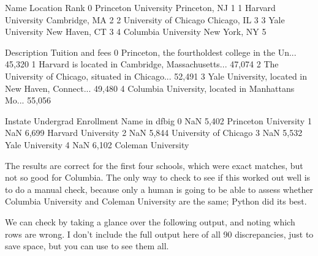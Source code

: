 \documentclass[letterpaper,10pt,english]{sphinxmanual}
\begin{document}
\begin{sphinxVerbatim}[commandchars=\\\{\}]
                    Name       Location  Rank  \PYGZbs{}
0   Princeton University  Princeton, NJ     1   
1     Harvard University  Cambridge, MA     2   
2  University of Chicago    Chicago, IL     3   
3        Yale University  New Haven, CT     3   
4    Columbia University   New York, NY     5   

                                         Description Tuition and fees  \PYGZbs{}
0  Princeton, the fourth\PYGZhy{}oldest college in the Un...         \PYGZdl{}45,320    
1  Harvard is located in Cambridge, Massachusetts...         \PYGZdl{}47,074    
2  The University of Chicago, situated in Chicago...         \PYGZdl{}52,491    
3  Yale University, located in New Haven, Connect...         \PYGZdl{}49,480    
4  Columbia University, located in Manhattan\PYGZsq{}s Mo...         \PYGZdl{}55,056    

  In\PYGZhy{}state Undergrad Enrollment         Name in df\PYGZus{}big  
0      NaN                5,402   Princeton University  
1      NaN                6,699     Harvard University  
2      NaN                5,844  University of Chicago  
3      NaN                5,532        Yale University  
4      NaN                6,102     Coleman University  
\end{sphinxVerbatim}

The results are correct for the first four schools, which were exact matches, but not so good for Columbia.  The only way to check to see if this worked out well is to do a manual check, because only a human is going to be able to assess whether Columbia University and Coleman University are the same; Python did its best.

We can check by taking a glance over the following output, and noting which rows are wrong.  I don’t include the full output here of all 90 discrepancies, just to save space, but you can use  to see them all.

\begin{sphinxVerbatim}[commandchars=\\\{\}]
  \PYG{p}{[} \PYG{p}{[}\PYG{p}{]}  \PYG{p}{[}\PYG{p}{]} \PYG{p}{]}
\PYG{p}{[}\PYG{p}{[}\PYG{p}{]}\PYG{p}{]}
\end{sphinxVerbatim}
\end{document}
